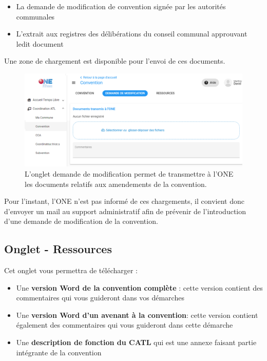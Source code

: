 \begin{itemize}
    \item La demande de modification de convention signée par les autorités communales 
    \item L’extrait aux registres des délibérations du conseil communal approuvant ledit document 
\end{itemize}

Une zone de chargement est disponible pour l’envoi de ces documents. 

\begin{figure}[htbp]
    \centering
    \includegraphics[width=12cm]{Images/catl/Demande de modification.png}
    \caption{L'onglet demande de modification permet de transmettre à l'ONE les documents relatifs aux amendements de la convention.}
    \label{fig:dmd_modif_convention}
\end{figure}


\begin{attention}
Pour l’instant, l’ONE n’est pas informé de ces chargements, il convient donc d’envoyer un mail au support administratif afin de prévenir de l’introduction d’une demande de modification de la convention.
\end{attention}

\subsection{Onglet - Ressources}
Cet onglet vous permettra de télécharger : 
\begin{itemize}
    \item Une \textbf{version Word de la convention complète} : cette version contient des commentaires qui vous guideront dans vos démarches
    \item Une \textbf{version Word d’un avenant à la convention}: cette version contient également des commentaires qui vous guideront dans cette démarche
    \item Une \textbf{description de fonction du CATL} qui est une annexe faisant partie intégrante de la convention 
\end{itemize}



